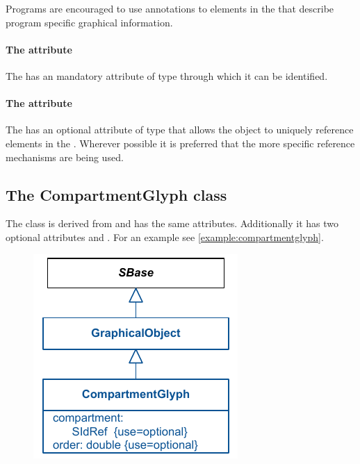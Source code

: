 Programs are encouraged to use annotations to \GraphicalObject elements 
in the  that describe program 
specific graphical information. 



\paragraph{The  attribute}
The \GraphicalObject has an mandatory  attribute of type 
 through which it can be identified. 


\paragraph{The  attribute}
The \GraphicalObject has an optional  attribute of type 
 that allows the object to uniquely reference elements in the \Model. 
Wherever possible it is preferred that the more specific reference 
mechanisms are being used. 


\subsection{The CompartmentGlyph class }
\label{compartmentglyph-class}
The \CompartmentGlyph class is derived from \GraphicalObject and has the 
same attributes. Additionally it has two optional attributes 
 and . For an example see \ref{example:compartmentglyph}.


\begin{figure}[!h]
\includegraphics{uml/layout-compartmentglyph-uml}\\
\label{uml:compartmentglyph}
\end{figure}


